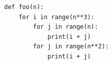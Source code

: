 \begin{prob}
    \timecomplexityinstructions

    \begin{verbatim}
        def foo(n):
            for i in range(n**3):
                for j in range(n):
                    print(i + j)
                for j in range(n**2):
                    print(i + j)
    \end{verbatim}


\end{prob}
